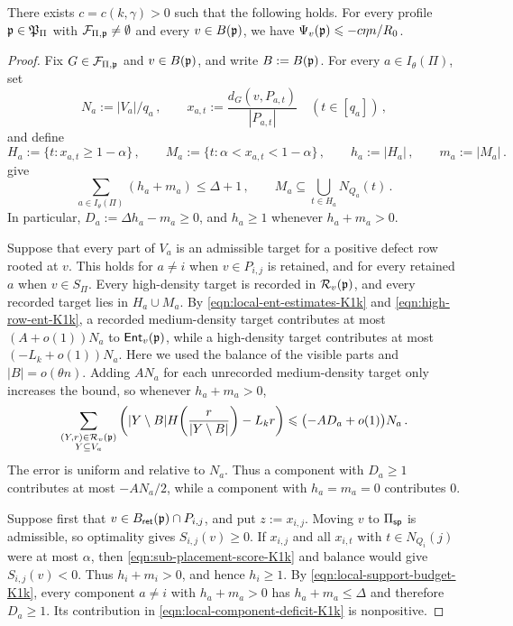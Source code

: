 \begin{lemma}\label{lemma:local-compensation-K1k}
There exists $c=c(k,\gamma)>0$ such that the following holds. For every profile ${\mathfrak p}\in{\mathfrak P}_\Pi$ with ${\mathcal F}_{\Pi,{\mathfrak p}}\neq\emptyset$ and every $v\in B({\mathfrak p})$, we have $\Psi_v({\mathfrak p})\leqslant -c\eta n/R_0$.
\end{lemma}
\begin{proof}
Fix $G\in{\mathcal F}_{\Pi,{\mathfrak p}}$ and $v\in B({\mathfrak p})$, and write $B:=B({\mathfrak p})$. For every $a\in I_\theta(\Pi)$, set
$$N_a:=|V_a|/q_a\,,\qquad x_{a,t}:=\frac{d_G(v,P_{a,t})}{|P_{a,t}|}\quad(t\in[q_a])\,,$$
and define
$$H_a:=\{t:x_{a,t}\geq1-\alpha\}\,,\qquad M_a:=\{t:\alpha<x_{a,t}<1-\alpha\}\,,\qquad h_a:=|H_a|\,,\qquad m_a:=|M_a|\,.$$
 give
\begin{equation}\label{eqn:local-support-budget-K1k}
\sum_{a\in I_\theta(\Pi)}(h_a+m_a)\leq\Delta+1\,,\qquad M_a\subseteq\bigcup_{t\in H_a}N_{Q_a}(t)\,.
\end{equation}
In particular, $D_a:=\Delta h_a-m_a\geq0$, and $h_a\geq1$ whenever $h_a+m_a>0$.

Suppose that every part of $V_a$ is an admissible target for a positive defect row rooted at $v$. This holds for $a\neq i$ when $v\in P_{i,j}$ is retained, and for every retained $a$ when $v\in S_\Pi$. Every high-density target is recorded in ${\mathcal R}_v({\mathfrak p})$, and every recorded target lies in $H_a\cup M_a$. By \eqref{eqn:local-ent-estimates-K1k} and \eqref{eqn:high-row-ent-K1k}, a recorded medium-density target contributes at most $(A+o(1))N_a$ to ${\mathsf{Ent}}_v({\mathfrak p})$, while a high-density target contributes at most $(-L_k+o(1))N_a$. Here we used the balance of the visible parts and $|B|=o(\theta n)$. Adding $AN_a$ for each unrecorded medium-density target only increases the bound, so whenever $h_a+m_a>0$,
\begin{equation}\label{eqn:local-component-deficit-K1k}
\sum_{\substack{(Y,r)\in{\mathcal R}_v({\mathfrak p})\\Y\subseteq V_a}}\left(|Y\setminus B|H\!\left(\frac{r}{|Y\setminus B|}\right)-L_kr\right)\leqslant\bigl(-AD_a+o(1)\bigr)N_a\,.
\end{equation}
The error is uniform and relative to $N_a$. Thus a component with $D_a\geq1$ contributes at most $-AN_a/2$, while a component with $h_a=m_a=0$ contributes $0$.

Suppose first that $v\in B_{\mathsf{ret}}({\mathfrak p})\cap P_{i,j}$, and put $z:=x_{i,j}$. Moving $v$ to $\Pi_{\mathsf{sp}}$ is admissible, so optimality gives $S_{i,j}(v)\geq0$. If $x_{i,j}$ and all $x_{i,t}$ with $t\in N_{Q_i}(j)$ were at most $\alpha$, then \eqref{eqn:sub-placement-score-K1k} and balance would give $S_{i,j}(v)<0$. Thus $h_i+m_i>0$, and hence $h_i\geq1$. By \eqref{eqn:local-support-budget-K1k}, every component $a\neq i$ with $h_a+m_a>0$ has $h_a+m_a\leq\Delta$ and therefore $D_a\geq1$. Its contribution in \eqref{eqn:local-component-deficit-K1k} is nonpositive.


\end{proof}
